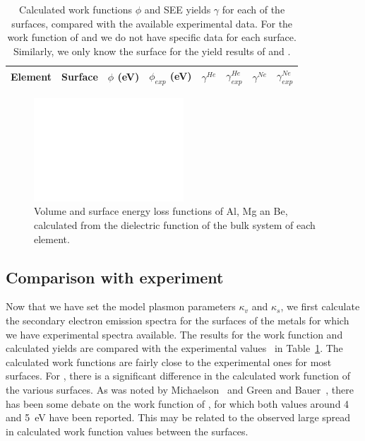 \begin{refsection}
\begin{table}[!h]
\centering
\renewcommand{\arraystretch}{1.3}
\caption{Calculated work functions $\phi$ and SEE yields $\gamma$ for each of the surfaces, compared with the available experimental data. For the work function of  and  we do not have specific data for each surface. Similarly, we only know the surface for the yield results of  and .}
\label{quotas:tab-metal_results}
\begin{tabular}{c @{\hskip 1em} | @{\hskip 1em} c @{\hskip 1em} | @{\hskip 1em}  c @{\hskip 1em} c @{\hskip 1em} | @{\hskip 1em}  c @{\hskip 2em}  c @{\hskip 1em} | @{\hskip 1em} c @{\hskip 2em} c}
 Element & Surface & $\phi$ (\si{\electronvolt}) & $\phi_{exp}$ (\si{\electronvolt}) & $\gamma^{He}$ & $\gamma^{He}_{exp}$ & $\gamma^{Ne}$ & $\gamma^{Ne}_{exp}$ \\\hline

\hline
\end{tabular}
\end{table}

\begin{figure}[!h]
\centering
\includegraphics[width=0.5\textwidth]{./figures/quotas/energy_loss.eps}
\caption{Volume and surface energy loss functions of Al, Mg an Be, calculated from the dielectric function of the bulk system of each element.}
\label{quotas:fig-energy_loss}
\end{figure}

\subsection{Comparison with experiment} \label{quotas:sec-results_metals}

Now that we have set the model plasmon parameters $\kappa_v$  and $\kappa_s$, we first calculate the secondary electron emission spectra for the surfaces of the metals for which we have experimental spectra available. The results for the work function and calculated yields are compared with the experimental values~\cite{DeWaele2016, Baragiola2001, Hagstrum1966} in Table~\ref{quotas:tab-metal_results}. The calculated work functions are fairly close to the experimental ones for most surfaces. For , there is a significant difference in the calculated work function of the various surfaces. As was noted by Michaelson~\cite{Michaelson1977} and Green and Bauer~\cite{Green1978}, there has been some debate on the work function of , for which both values around 4 and 5~\si{\electronvolt} have been reported. This may be related to the observed large spread in calculated work function values between the surfaces. 


\end{refsection}
